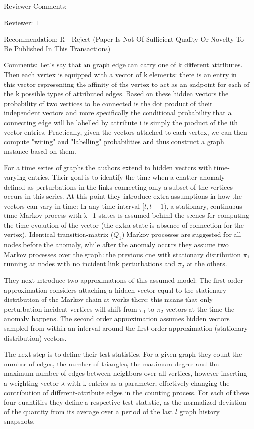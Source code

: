 Reviewer Comments:

Reviewer: 1

Recommendation: R - Reject (Paper Is Not Of Sufficient Quality Or
Novelty To Be Published In This Transactions)

Comments:
Let's say that an graph edge can carry one of k different
attributes. Then each vertex is equipped with a vector of k elements:
there is an entry in this vector representing the affinity of the
vertex to act as an endpoint for each of the k possible types of
attributed edges. Based on these hidden vectors the probability of two
vertices to be connected is the dot product of their independent
vectors and more specifically the conditional probability that a
connecting edge will be labelled by attribute i is simply the product
of the ith vector entries. Practically, given the vectors attached to
each vertex, we can then compute "wiring" and "labelling"
probabilities and thus construct a graph instance based on them.

For a time series of graphs the authors extend to hidden vectors with
time-varying entries. Their goal is to identify the time when a
chatter anomaly - defined as perturbations in the links connecting
only a subset of the vertices - occurs in this series. At this point
they introduce extra assumptions in how the vectors can vary in time:
In any time interval $[t, t+1)$, a stationary, continuous-time Markov
process with k+1 states is assumed behind the scenes for computing the
time evolution of the vector (the extra state is absence of connection
for the vertex). Identical transition-matrix ($Q_1$) Markov processes
are suggested for all nodes before the anomaly, while after the
anomaly occurs they assume two Markov processes over the graph: the
previous one with stationary distribution $\pi_1$ running at nodes
with no incident link perturbations and $\pi_2$ at the others.

They next introduce two approximations of this assumed model: The
first order approximation considers attaching a hidden vector equal to
the stationary distribution of the Markov chain at works there; this
means that only perturbation-incident vertices will shift from $\pi_1$
to $\pi_2$ vectors at the time the anomaly happens. The second order
approximation assumes hidden vectors sampled from within an interval
around the first order approximation (stationary-distribution)
vectors.

The next step is to define their test statistics. For a given graph
they count the number of edges, the number of triangles, the maximum
degree and the maximum number of edges between neighbors over all
vertices, however inserting a weighting vector $\lambda$ with k
entries as a parameter, effectively changing the contribution of
different-attribute edges in the counting process. For each of these
four quantities they define a respective test statistic, as the
normalized deviation of the quantity from its average over a period of
the last $l$ graph history snapshots.

